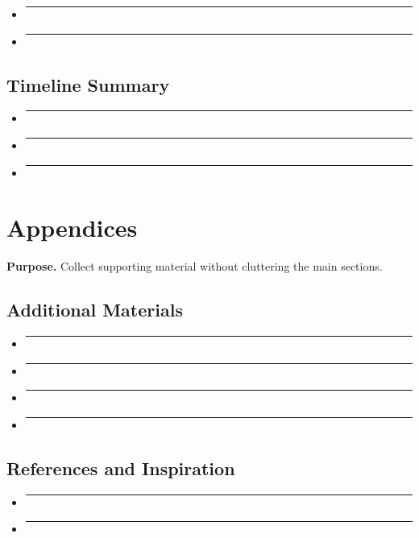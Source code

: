 \documentclass[12pt]{article}
\newcommand{\placeholder}[1]{\rule[-0.4em]{0pt}{2em}\rule{0.62\linewidth}{0.4pt}}
\begin{document}
\begin{itemize}
    \item \placeholder{Team roles and approximate headcount.}
    \item \placeholder{External contractors, vendors, or partners.}
\end{itemize}

\subsection{Timeline Summary}

\begin{itemize}
    \item \placeholder{Estimated schedule by date or by phase duration.}
    \item \placeholder{Key internal and external deadlines.}
    \item \placeholder{Buffers or risk allowances for delays.}
\end{itemize}

\section{Appendices}

\textbf{Purpose.} Collect supporting material without cluttering the main sections.

\subsection{Additional Materials}

\begin{itemize}
    \item \placeholder{Links or references to concept art boards.}
    \item \placeholder{Level layout sketches and diagrams.}
    \item \placeholder{Flowcharts for mechanics, combat systems, or menus.}
    \item \placeholder{Storyboards for cutscenes or key narrative moments.}
\end{itemize}

\subsection{References and Inspiration}

\begin{itemize}
    \item \placeholder{List of games, films, books, or articles that inspired the design.}
    \item \placeholder{Any external resources or research that informed this document.}
\end{itemize}
\end{document}
